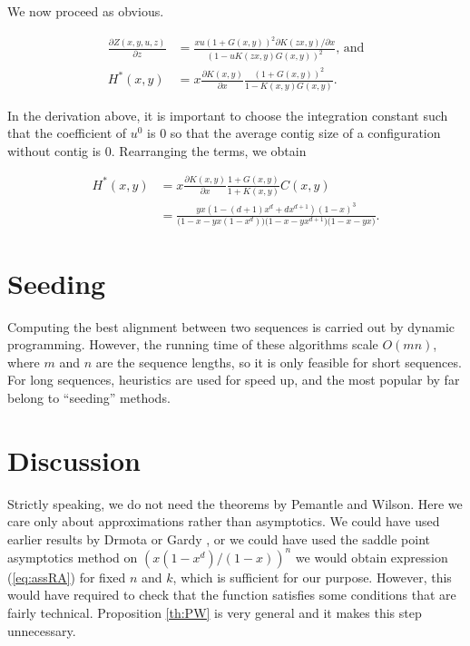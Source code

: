 \documentclass{article}
\begin{document}
We now proceed as obvious.

\begin{equation*}
\begin{split}
\frac{\partial Z(x,y,u,z)}{\partial z} &=
\frac{xu\left(1+G(x,y)\right)^2 \partial K(zx,y)/ \partial x}
{\left(1-uK(zx,y)G(x,y)\right)^2} \text{, and} \\
H^*(x,y) &=  x \frac{\partial K(x,y)}{\partial x}
\frac{\left(1+G(x,y)\right)^2}{1-K(x,y)G(x,y)}.
\end{split}
\end{equation*}

In the derivation above, it is important to choose the integration
constant such that the coefficient of $u^0$ is $0$ so that the average
contig size of a configuration without contig is $0$. Rearranging the
terms, we obtain

\begin{equation*}
\begin{split}
H^*(x,y) &= x \frac{\partial K(x,y)}{\partial x}
\frac{1+G(x,y)}{1+K(x,y)}C(x,y) \\
&= \frac{yx(1-(d+1)x^d+dx^{d+1})(1-x)^3}
{\big(1-x-yx(1-x^d)\big)\big(1-x-yx^{d+1}\big)\big(1-x-yx\big)}.
\end{split}
\end{equation*}




\section{Seeding}

Computing the best alignment between two sequences is carried out by
dynamic programming. However, the running time of these algorithms scale
$O(mn)$, where $m$ and $n$ are the sequence lengths, so it is only
feasible for short sequences. For long sequences, heuristics are used for
speed up, and the most popular by far belong to ``seeding'' methods.



\section{Discussion}

Strictly speaking, we do not need the theorems by Pemantle and Wilson.
Here we care only about approximations rather than asymptotics. We could
have used earlier results by Drmota \cite{Drmota1994} or Gardy
\cite{Gardy1995}, or we could have used the saddle point asymptotics
method on $(x(1-x^d)/(1-x))^n$ we would obtain expression (\ref{eq:assRA})
for fixed $n$ and $k$, which is sufficient for our purpose. However, this
would have required to check that the function satisfies some conditions
that are fairly technical. Proposition \ref{th:PW} is very general and it
makes this step unnecessary.
\end{document}
